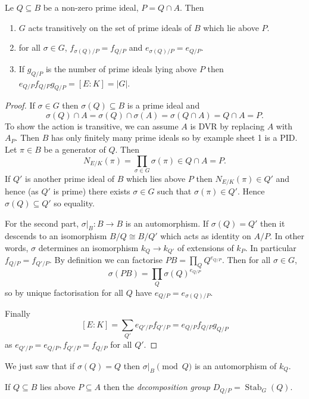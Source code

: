 \documentclass[a4paper]{article}
\begin{document}
\begin{proposition}
  Le \(Q \subseteq B\) be a non-zero prime ideal, \(P = Q \cap A\). Then
  \begin{enumerate}
  \item \(G\) acts transitively on the set of prime ideals of \(B\) which lie above \(P\).
  \item for all \(\sigma \in G\), \(f_{\sigma(Q)/P} = f_{Q/P}\) and \(e_{\sigma(Q)/P} = e_{Q/P}\).
  \item If \(g_{Q/P}\) is the number of prime ideals lying above \(P\) then \(e_{Q/P} f_{Q/P} g_{Q/P} = [E : K] = |G|\).
  \end{enumerate}
\end{proposition}

\begin{proof}
  If \(\sigma \in G\) then \(\sigma(Q) \subseteq B\) is a prime ideal and
  \[
    \sigma(Q) \cap A = \sigma(Q) \cap \sigma(A) = \sigma(Q \cap A) = Q \cap A = P.
  \]
  To show the action is transitive, we can assume \(A\) is DVR by replacing \(A\) with \(A_P\). Then \(B\) has only finitely many prime ideals so by example sheet 1 is a PID. Let \(\pi \in B\) be a generator of \(Q\). Then
  \[
    N_{E/K}(\pi) = \prod_{\sigma \in G} \sigma(\pi) \in Q \cap A = P.
  \]
  If \(Q'\) is another prime ideal of \(B\) which lies above \(P\) then \(N_{E/K}(\pi) \in Q'\) and hence (as \(Q'\) is prime) there exists \(\sigma \in G\) such that \(\sigma(\pi) \in Q'\). Hence \(\sigma(Q) \subseteq Q'\) so equality.

  For the second part, \(\sigma|_B: B \to B\) is an automorphism. If \(\sigma(Q) = Q'\) then it descends to an isomorphism \(B/Q \cong B/Q'\) which acts as identity on \(A/P\). In other words, \(\sigma\) determines an isomorphism \(k_Q \to k_{Q'}\) of extensions of \(k_P\). In particular \(f_{Q/P} = f_{Q'/P}\). By definition we can factorise \(PB = \prod_Q Q^{e_{Q/P}}\). Then for all \(\sigma \in G\),
  \[
    \sigma(PB) = \prod_Q \sigma(Q)^{e_{Q/P}}
  \]
  so by unique factorisation for all \(Q\) have \(e_{Q/P} = e_{\sigma(Q)/P}\).

  Finally
  \[
    [E: K] = \sum_{Q'} e_{Q'/P} f_{Q'/P} = e_{Q/P} f_{Q/P} g_{Q/P}
  \]
  as \(e_{Q'/P} = e_{Q/P}, f_{Q'/P} = f_{Q/P}\) for all \(Q'\).
\end{proof}

We just saw that if \(\sigma(Q) = Q\) then \(\sigma|_B \pmod Q\) is an automorphism of \(k_Q\).

\begin{definition}
  If \(Q \subseteq B\) lies above \(P \subseteq A\) then the \emph{decomposition group} \(D_{Q/P} = \operatorname{Stab}_G(Q)\).
\end{definition}
\end{document}
